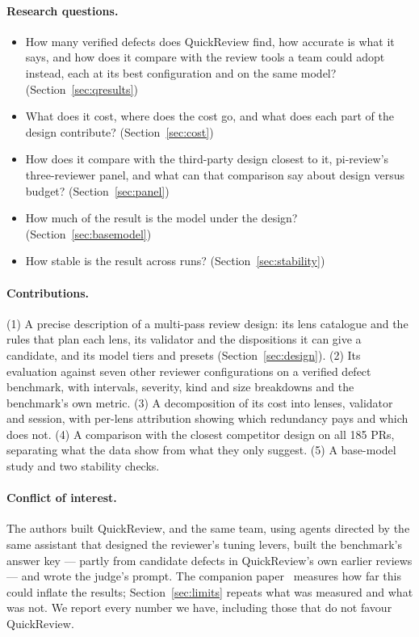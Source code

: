 \documentclass[11pt,a4paper]{article}
\newcommand{\qcr}{QuickReview}
\begin{document}
\paragraph{Research questions.}
\begin{itemize}
  \item[\textbf{RQ1}] How many verified defects does \qcr{} find, how
  accurate is what it says, and how does it compare with the review tools a
  team could adopt instead, each at its best configuration and on the same
  model? (Section~\ref{sec:qresults})
  \item[\textbf{RQ2}] What does it cost, where does the cost go, and what
  does each part of the design contribute? (Section~\ref{sec:cost})
  \item[\textbf{RQ3}] How does it compare with the third-party design
  closest to it, pi-review's three-reviewer panel, and what can that
  comparison say about design versus budget? (Section~\ref{sec:panel})
  \item[\textbf{RQ4}] How much of the result is the model under the design?
  (Section~\ref{sec:basemodel})
  \item[\textbf{RQ5}] How stable is the result across runs?
  (Section~\ref{sec:stability})
\end{itemize}

\paragraph{Contributions.} (1) A precise description of a multi-pass review
design: its lens catalogue and the rules that plan each lens, its validator
and the dispositions it can give a candidate, and its model tiers and
presets (Section~\ref{sec:design}). (2) Its evaluation against seven other
reviewer configurations on a verified defect benchmark, with intervals,
severity, kind and size breakdowns and the benchmark's own metric. (3) A
decomposition of its cost into lenses, validator and session, with per-lens
attribution showing which redundancy pays and which does not. (4) A
comparison with the closest competitor design on all 185 PRs, separating
what the data show from what they only suggest. (5) A base-model study and
two stability checks.

\paragraph{Conflict of interest.} The authors built \qcr{}, and the same
team, using agents directed by the same assistant that designed the
reviewer's tuning levers, built the benchmark's answer key --- partly from
candidate defects in \qcr{}'s own earlier reviews --- and wrote the judge's
prompt. The companion paper~\cite{qcrbench} measures how far this could
inflate the results; Section~\ref{sec:limits} repeats what was measured and
what was not. We report every number we have, including those that do not
favour \qcr{}.
\end{document}
